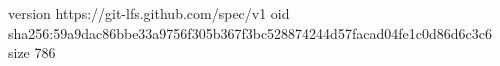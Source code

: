 version https://git-lfs.github.com/spec/v1
oid sha256:59a9dac86bbe33a9756f305b367f3bc528874244d57facad04fe1c0d86d6c3c6
size 786
